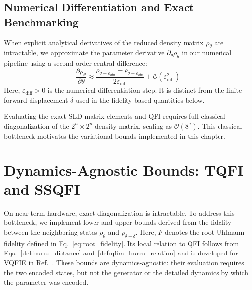 \subsection{Numerical Differentiation and Exact Benchmarking}
When explicit analytical derivatives of the reduced density matrix $\rho_\theta$ are intractable, we approximate the parameter derivative $\partial_\theta \rho_\theta$ in our numerical pipeline using a second-order central difference:
\begin{equation}
    \frac{\partial \rho_\theta}{\partial \theta}
    \approx
    \frac{\rho_{\theta+\varepsilon_{\mathrm{diff}}}-\rho_{\theta-\varepsilon_{\mathrm{diff}}}}
    {2\varepsilon_{\mathrm{diff}}}
    +\mathcal{O}(\varepsilon_{\mathrm{diff}}^2)
    \label{eq:central_difference}
\end{equation}
Here, $\varepsilon_{\mathrm{diff}}>0$ is the numerical differentiation step. It is distinct from the finite forward displacement $\delta$ used in the fidelity-based quantities below.

Evaluating the exact SLD matrix elements and QFI requires full classical diagonalization of the $2^n \times 2^n$ density matrix, scaling as $\mathcal{O}(8^n)$. This classical bottleneck motivates the variational bounds implemented in this chapter.

\section{Dynamics-Agnostic Bounds: TQFI and SSQFI} \label{sec:bounds}

On near-term hardware, exact diagonalization is intractable. To address this bottleneck, we implement lower and upper bounds derived from the fidelity between the neighboring states $\rho_\theta$ and $\rho_{\theta+\delta}$. Here, $F$ denotes the root Uhlmann fidelity defined in Eq.~\eqref{eq:root_fidelity}. Its local relation to QFI follows from Eqs.~\eqref{def:bures_distance} and~\eqref{def:qfim_bures_relation} and is developed for VQFIE in Ref.~\cite{beckey2022vqfiea}. These bounds are dynamics-agnostic: their evaluation requires the two encoded states, but not the generator or the detailed dynamics by which the parameter was encoded.

